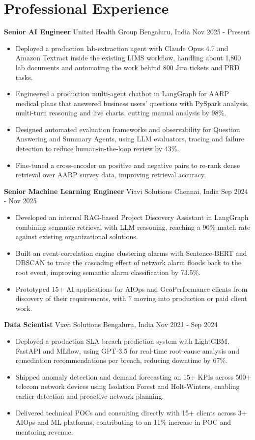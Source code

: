 \documentclass[10pt,a4paper]{article}
\newcommand{\role}[4]{\textbf{#1} \textbar{} #2 \hfill #3 \textbar{} #4\par}
\begin{document}
\section{Professional Experience}
\role{Senior AI Engineer}{United Health Group}{Bengaluru, India}{Nov 2025 - Present}
\begin{itemize}
  \item Deployed a production lab-extraction agent with Claude Opus 4.7 and Amazon Textract inside the existing LIMS workflow, handling about 1,800 lab documents and automating the work behind 800 Jira tickets and PRD tasks.
  \item Engineered a production multi-agent chatbot in LangGraph for AARP medical plans that answered business users' questions with PySpark analysis, multi-turn reasoning and live charts, cutting manual analysis by 98\%.
  \item Designed automated evaluation frameworks and observability for Question Answering and Summary Agents, using LLM evaluators, tracing and failure detection to reduce human-in-the-loop review by 43\%.
  \item Fine-tuned a cross-encoder on positive and negative pairs to re-rank dense retrieval over AARP survey data, improving retrieval accuracy.
\end{itemize}
\vspace{3pt}
\role{Senior Machine Learning Engineer}{Viavi Solutions}{Chennai, India}{Sep 2024 - Nov 2025}
\begin{itemize}
  \item Developed an internal RAG-based Project Discovery Assistant in LangGraph combining semantic retrieval with LLM reasoning, reaching a 90\% match rate against existing organizational solutions.
  \item Built an event-correlation engine clustering alarms with Sentence-BERT and DBSCAN to trace the cascading effect of network alarm floods back to the root event, improving semantic alarm classification by 73.5\%.
  \item Prototyped 15+ AI applications for AIOps and GeoPerformance clients from discovery of their requirements, with 7 moving into production or paid client work.
\end{itemize}
\vspace{3pt}
\role{Data Scientist}{Viavi Solutions}{Bengaluru, India}{Nov 2021 - Sep 2024}
\begin{itemize}
  \item Deployed a production SLA breach prediction system with LightGBM, FastAPI and MLflow, using GPT-3.5 for real-time root-cause analysis and remediation recommendations per breach, reducing downtime by 67\%.
  \item Shipped anomaly detection and demand forecasting on 15+ KPIs across 500+ telecom network devices using Isolation Forest and Holt-Winters, enabling earlier detection and proactive network planning.
  \item Delivered technical POCs and consulting directly with 15+ clients across 3+ AIOps and ML platforms, contributing to an 11\% increase in POC and mentoring revenue.
\end{itemize}
\end{document}
